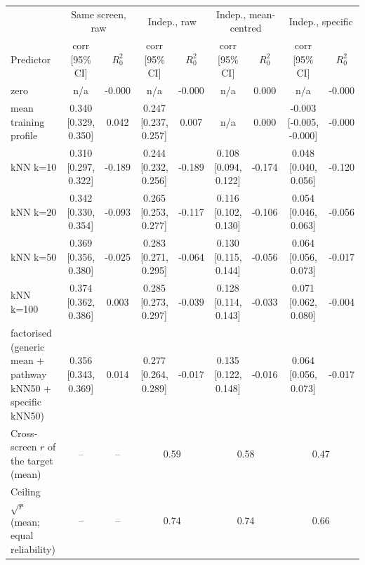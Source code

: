 \begin{tabular}{l cc cc cc cc}
\toprule
 & \multicolumn{2}{c}{Same screen, raw} & \multicolumn{2}{c}{Indep., raw} & \multicolumn{2}{c}{Indep., mean-centred} & \multicolumn{2}{c}{Indep., specific} \\
Predictor & corr [95\% CI] & $R^2_0$ & corr [95\% CI] & $R^2_0$ & corr [95\% CI] & $R^2_0$ & corr [95\% CI] & $R^2_0$ \\
\midrule
zero & n/a & -0.000 & n/a & -0.000 & n/a & 0.000 & n/a & -0.000 \\
mean training profile & 0.340 [0.329, 0.350] & 0.042 & 0.247 [0.237, 0.257] & 0.007 & n/a & 0.000 & -0.003 [-0.005, -0.000] & -0.000 \\
kNN k=10 & 0.310 [0.297, 0.322] & -0.189 & 0.244 [0.232, 0.256] & -0.189 & 0.108 [0.094, 0.122] & -0.174 & 0.048 [0.040, 0.056] & -0.120 \\
kNN k=20 & 0.342 [0.330, 0.354] & -0.093 & 0.265 [0.253, 0.277] & -0.117 & 0.116 [0.102, 0.130] & -0.106 & 0.054 [0.046, 0.063] & -0.056 \\
kNN k=50 & 0.369 [0.356, 0.380] & -0.025 & 0.283 [0.271, 0.295] & -0.064 & 0.130 [0.115, 0.144] & -0.056 & 0.064 [0.056, 0.073] & -0.017 \\
kNN k=100 & 0.374 [0.362, 0.386] & 0.003 & 0.285 [0.273, 0.297] & -0.039 & 0.128 [0.114, 0.143] & -0.033 & 0.071 [0.062, 0.080] & -0.004 \\
factorised (generic mean + pathway kNN50 + specific kNN50) & 0.356 [0.343, 0.369] & 0.014 & 0.277 [0.264, 0.289] & -0.017 & 0.135 [0.122, 0.148] & -0.016 & 0.064 [0.056, 0.073] & -0.017 \\
\midrule
Cross-screen $r$ of the target (mean) & -- & -- & \multicolumn{2}{c}{0.59} & \multicolumn{2}{c}{0.58} & \multicolumn{2}{c}{0.47} \\
Ceiling $\sqrt{r}$ (mean; equal reliability) & -- & -- & \multicolumn{2}{c}{0.74} & \multicolumn{2}{c}{0.74} & \multicolumn{2}{c}{0.66} \\
\bottomrule
\end{tabular}